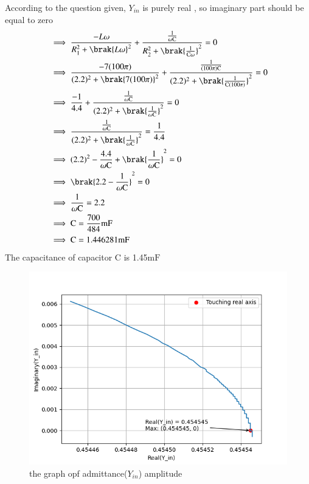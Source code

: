 \documentclass[a4,12pt,onecolumn]{IEEEtran}
\begin{document}
According to the question given, $Y_{in}$ is purely real , so imaginary part should be equal to zero\\
\begin{align}
&\implies \frac{-L\omega}{R_1^2+\brak{L\omega}^2} + \frac{\frac{1}{ \omega \text{C}}}{R_2^2+\brak{\frac{1}{ \text{C}\omega}}^2}=0\\
&\implies \frac{-7(100\pi)}{(2.2)^2+\brak{7(100\pi)}^2} + \frac{\frac{1}{ (100\pi) \text{C}}}{(2.2)^2+\brak{\frac{1}{\text{C}(100\pi)}}^2}=0\\
&\implies  \frac{-1}{4.4}+\frac{\frac{1}{\omega\text{C}}}{(2.2)^2+\brak{\frac{1}{\omega\text{C}}}^2}=0\\
&\implies \frac{\frac{1}{\omega\text{C}}}{(2.2)^2+\brak{\frac{1}{\omega\text{C}}}^2}=\frac{1}{4.4}\\
&\implies  (2.2)^2-\frac{4.4}{\omega\text{C}}+\brak{\frac{1}{\omega\text{C}}}^2=0\\
&\implies  \brak{2.2-\frac{1}{\omega\text{C}}}^2=0\\
&\implies  \frac{1}{\omega\text{C}}=2.2\\
&\implies  \text{C}=\frac{700}{484}\text{mF}\\
&\implies  \text{C}=1.446281\text{mF}
\end{align}
The capacitance of capacitor $\text{C}$ is 1.45$\text{mF}$
\begin{figure}[ht!]
\includegraphics[width=\columnwidth]{figs/fig2.png}
\caption{the graph opf admittance($Y_{in}$) amplitude}
\end{figure}
\end{document}
